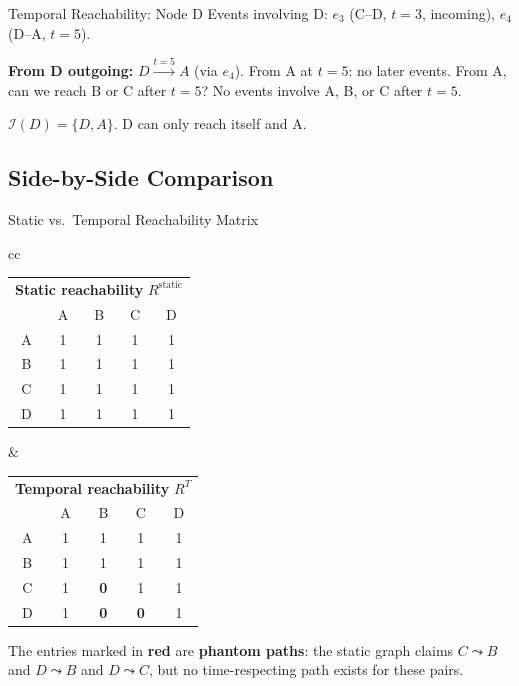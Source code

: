 \begin{examplebox}{Temporal Reachability: Node D}
Events involving D: $e_3$ (C--D, $t=3$, incoming), $e_4$ (D--A, $t=5$).

\textbf{From D outgoing:} $D \xrightarrow{t=5} A$ (via $e_4$). From A at $t=5$: no later
events. From A, can we reach B or C after $t=5$? No events involve A, B, or C after $t=5$.

$\mathcal{I}(D) = \{D, A\}$. D can only reach itself and A.
\end{examplebox}

\subsection{Side-by-Side Comparison}

\begin{examplebox}{Static vs.\ Temporal Reachability Matrix}

\begin{center}
\begin{tabular}{cc}
\begin{tabular}{c|cccc}
\multicolumn{5}{c}{\textbf{Static reachability} $R^{\text{static}}$}\\[2pt]
  & A & B & C & D \\
\hline
A & 1 & 1 & 1 & 1 \\
B & 1 & 1 & 1 & 1 \\
C & 1 & 1 & 1 & 1 \\
D & 1 & 1 & 1 & 1 \\
\end{tabular}
&
\begin{tabular}{c|cccc}
\multicolumn{5}{c}{\textbf{Temporal reachability} $R^T$}\\[2pt]
  & A & B & C & D \\
\hline
A & 1 & 1 & 1 & 1 \\
B & 1 & 1 & 1 & 1 \\
C & 1 & \textcolor{red!70!black}{\textbf{0}} & 1 & 1 \\
D & 1 & \textcolor{red!70!black}{\textbf{0}} & \textcolor{red!70!black}{\textbf{0}} & 1 \\
\end{tabular}
\end{tabular}
\end{center}

\medskip
The entries marked in \textcolor{red!70!black}{\textbf{red}} are \textbf{phantom paths}: the
static graph claims $C \leadsto B$ and $D \leadsto B$ and $D \leadsto C$, but no
time-respecting path exists for these pairs.


\end{examplebox}
